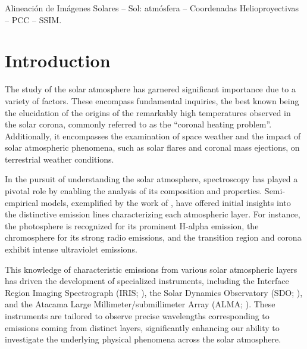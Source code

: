 \documentclass[a4paper,alpha-refs]{eSpectra}
\begin{document}
\begin{frontmatter}
\begin{abstract}



\end{abstract}
\begin{skeywords}
Alineación de Imágenes Solares -- Sol: atmósfera -- Coordenadas Helioproyectivas -- PCC -- SSIM.
\end{skeywords}


\end{frontmatter}

\section{Introduction}

The study of the solar atmosphere has garnered significant importance due to a variety of factors. These encompass fundamental inquiries, the best known being the elucidation of the origins of the remarkably high temperatures observed in the solar corona, commonly referred to as the ``coronal heating problem''. Additionally, it encompasses the examination of space weather and the impact of solar atmospheric phenomena, such as solar flares and coronal mass ejections, on terrestrial weather conditions.

In the pursuit of understanding the solar atmosphere, spectroscopy has played a pivotal role by enabling the analysis of its composition and properties. Semi-empirical models, exemplified by the work of \cite{vernazza_structure_1981}, have offered initial insights into the distinctive emission lines characterizing each atmospheric layer. For instance, the photosphere is recognized for its prominent H-alpha emission, the chromosphere for its strong radio emissions, and the transition region and corona exhibit intense ultraviolet emissions.

This knowledge of characteristic emissions from various solar atmospheric layers has driven the development of specialized instruments, including the  Interface Region Imaging Spectrograph (IRIS; \cite{depontieu_interface_2014_IRIS}), the Solar Dynamics Observatory (SDO; \cite{SDO_pesnell}), and the Atacama Large Millimeter/submillimeter Array (ALMA; \cite{wootten_atacama_2009}). These instruments are tailored to observe precise wavelengths corresponding to emissions coming from distinct layers, significantly enhancing our ability to investigate the underlying physical phenomena across the solar atmosphere.
\end{document}
